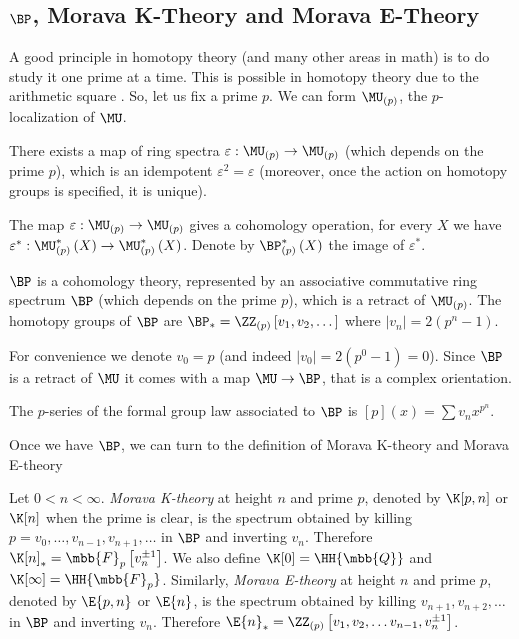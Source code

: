 \subsection{\texorpdfstring{$\BP$}{BP}, Morava K-Theory and Morava E-Theory}

A good principle in homotopy theory (and many other areas in math) is to do study it one prime at a time.
This is possible in homotopy theory due to the arithmetic square .
So, let us fix a prime $p$.
We can form $\MU_{\left(p\right)}$, the $p$-localization of $\MU$.

\begin{theorem}
	There exists a map of ring spectra $\varepsilon: \MU_{\left(p\right)} \to \MU_{\left(p\right)}$ (which depends on the prime $p$), which is an idempotent $\varepsilon^2 = \varepsilon$ (moreover, once the action on homotopy groups is specified, it is unique).
\end{theorem}

The map $\varepsilon: \MU_{\left(p\right)} \to \MU_{\left(p\right)}$ gives a cohomology operation, for every $X$ we have $\varepsilon^*: \MU_{\left(p\right)}^*\left(X\right) \to \MU_{\left(p\right)}^*\left(X\right)$.
Denote by $\BP_{\left(p\right)}^*\left(X\right)$ the image of $\varepsilon^*$.

\begin{theorem}
	$\BP$ is a cohomology theory, represented by an associative commutative ring spectrum $\BP$ (which depends on the prime $p$), which is a retract of $\MU_{\left(p\right)}$.
	The homotopy groups of $\BP$ are $\BP_* = \ZZ_{\left(p\right)}\left[v_1, v_2, \dotsc\right]$ where $\left|v_n\right| = 2\left(p^n-1\right)$.
\end{theorem}

For convenience we denote $v_0 = p$ (and indeed $\left|v_0\right| = 2\left(p^0-1\right) = 0$).
Since $\BP$ is a retract of $\MU$ it comes with a map $\MU \to \BP$, that is a complex orientation.

\begin{proposition}
	The $p$-series of the formal group law associated to $\BP$ is
	$\left[p\right]\left(x\right) = \sum v_n x^{p^n}$.
\end{proposition}

Once we have $\BP$, we can turn to the definition of Morava K-theory and Morava E-theory

\begin{definition}
	Let $0 < n < \infty$.
	\emph{Morava K-theory} at height $n$ and prime $p$, denoted by $\K[p,n]$ or $\K[n]$ when the prime is clear, is the spectrum obtained by killing $p=v_0, \dotsc, v_{n-1}, v_{n+1}, \dotsc$ in $\BP$ and inverting $v_n$.
	Therefore $\K[n]_* = \mbb{F}_p\left[v_n^{\pm 1}\right]$.
	We also define $\K[0] = \HH{\mbb{Q}}$ and $\K[\infty] = \HH{\mbb{F}_p}$.
	Similarly, \emph{Morava E-theory} at height $n$ and prime $p$, denoted by $\E{p,n}$ or $\E{n}$, is the spectrum obtained by killing $v_{n+1}, v_{n+2}, \dotsc$ in $\BP$ and inverting $v_n$.
	Therefore $\E{n}_* = \ZZ_{\left(p\right)}\left[v_1, v_2, \dotsc v_{n-1}, v_n^{\pm 1}\right]$.
\end{definition}

